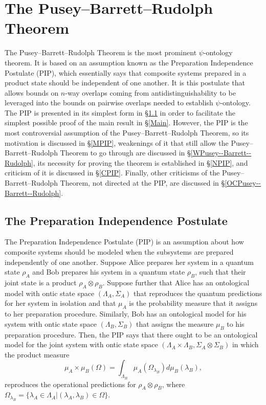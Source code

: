 \documentclass[DIV=calc,fontsize=12pt]{scrartcl} %
\theoremstyle{definition}
\theoremstyle{plain}
\begin{document}
\section{The Pusey--Barrett--Rudolph Theorem}

\label{Pusey--Barrett--Rudolph}

The Pusey--Barrett--Rudolph Theorem is the most prominent $\psi$-ontology theorem.  It is
based on an assumption known as the Preparation Independence Postulate
(PIP), which essentially says that composite systems prepared in a
product state should be independent of one another.  It is this
postulate that allows bounds on $n$-way overlaps coming from
antidistinguishability to be leveraged into the bounds on pairwise
overlaps needed to establish $\psi$-ontology.  The PIP is presented in
its simplest form in \S\ref{PIP} in order to facilitate the simplest
possible proof of the main result in \S\ref{Main}.  However, the PIP
is the most controversial assumption of the Pusey--Barrett--Rudolph Theorem, so its
motivation is discussed in \S\ref{MPIP}, weakenings of it that still
allow the Pusey--Barrett--Rudolph Theorem to go through are discussed in \S\ref{WPusey--Barrett--Rudolph}, its
necessity for proving the theorem is established in \S\ref{NPIP}, and
criticism of it is discussed in \S\ref{CPIP}.  Finally, other
criticisms of the Pusey--Barrett--Rudolph Theorem, not directed at the PIP, are discussed
in \S\ref{OCPusey--Barrett--Rudolph}.


\subsection{The Preparation Independence Postulate}

\label{PIP}

The Preparation Independence Postulate (PIP) is an assumption about
how composite systems should be modeled when the subsystems are
prepared independently of one another.  Suppose Alice prepares her
system in a quantum state $\rho_A$ and Bob prepares his system in a
quantum state $\rho_B$, such that their joint state is a product
$\rho_A \otimes \rho_B$.  Suppose further that Alice has an
ontological model with ontic state space $(\Lambda_A,\Sigma_A)$ that
reproduces the quantum predictions for her system in isolation and
that $\mu_A$ is the probability measure that it assigns to her
preparation procedure.  Similarly, Bob has an ontological model for
his system with ontic state space $(\Lambda_B,\Sigma_B)$ that assigns
the measure $\mu_B$ to his preparation procedure.  Then, the PIP says
that there ought to be an ontological model for the joint system with
ontic state space $(\Lambda_A \times \Lambda_B, \Sigma_A \otimes
\Sigma_B)$ in which the product measure
\begin{equation}
\mu_A \times \mu_B(\Omega) = \int_{\Lambda_B}
\mu_A(\Omega_{\lambda_B}) d \mu_B(\lambda_B),
\end{equation}
reproduces the operational predictions for $\rho_A \otimes \rho_B$,
where $\Omega_{\lambda_B} = \{\lambda_A \in \Lambda_A |
(\lambda_A,\lambda_B) \in \Omega \}$.
\end{document}

